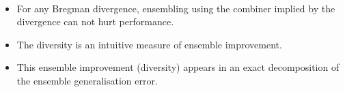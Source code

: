 \documentclass[../main.tex]{subfiles}
\begin{document}
\begin{corollary} ~ ~ 
    \label{cor:bregman-divergences}
    \begin{itemize}
        \item For any Bregman divergence, ensembling using the combiner implied by the divergence can not hurt performance.
        \item The diversity is an intuitive measure of ensemble improvement.
        \item This ensemble improvement (diversity) appears in an exact decomposition of the ensemble generalisation error.
    \end{itemize}
\end{corollary}


\end{document}
